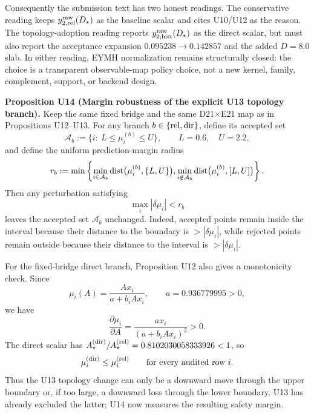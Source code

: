 \documentclass[aps,prd,onecolumn,notitlepage,nofootinbib,superscriptaddress,11pt,floatfix]{revtex4-2}
\begin{document}
Consequently the submission text has two honest readings.  The conservative reading keeps \(y_{2,{\rm rel}}^{\rm raw}(D_\star)\) as the baseline scalar and cites U10/U12 as the reason.  The topology-adoption reading reports \(y_{2,{\rm hist}}^{\rm raw}(D_\star)\) as the direct scalar, but must also report the acceptance expansion \(0.095238\to0.142857\) and the added \(D=8.0\) slab.  In either reading, EYMH normalization remains structurally closed: the choice is a transparent observable-map policy choice, not a new kernel, family, complement, support, or backend design.

\medskip\noindent\textbf{Proposition U14 (Margin robustness of the explicit U13 topology branch).}
Keep the same fixed bridge and the same D21\(\times\)E21 map as in Propositions U12--U13.  For any branch \(b\in\{{\rm rel},{\rm dir}\}\), define its accepted set
\[
\mathcal A_b:=\{i:\ L\le \mu_i^{(b)}\le U\},
\qquad
L=0.6,\quad U=2.2,
\]
and define the uniform prediction-margin radius
\[
r_b:=
\min\left\{
\min_{i\in\mathcal A_b}{\rm dist}\bigl(\mu_i^{(b)},\{L,U\}\bigr),
\min_{i\notin\mathcal A_b}{\rm dist}\bigl(\mu_i^{(b)},[L,U]\bigr)
\right\}.
\]
Then any perturbation satisfying
\[
\max_i|\delta\mu_i|<r_b
\]
leaves the accepted set \(\mathcal A_b\) unchanged.  Indeed, accepted points remain inside the interval because their distance to the boundary is \(>|\delta\mu_i|\), while rejected points remain outside because their distance to the interval is \(>|\delta\mu_i|\).

For the fixed-bridge direct branch, Proposition U12 also gives a monotonicity check.  Since
\[
\mu_i(A)=\frac{Ax_i}{a+b_iAx_i},
\qquad
a=0.936779995>0,
\]
we have
\[
\frac{\partial \mu_i}{\partial A}
=
\frac{a x_i}{(a+b_iAx_i)^2}>0.
\]
The direct scalar has \(A_\star^{\rm(dir)}/A_\star^{\rm(rel)}=0.8102030058333926<1\), so
\[
\mu_i^{\rm(dir)}\le \mu_i^{\rm(rel)}
\qquad\text{for every audited row }i.
\]
Thus the U13 topology change can only be a downward move through the upper boundary or, if too large, a downward loss through the lower boundary.  U13 has already excluded the latter; U14 now measures the resulting safety margin.
\end{document}
